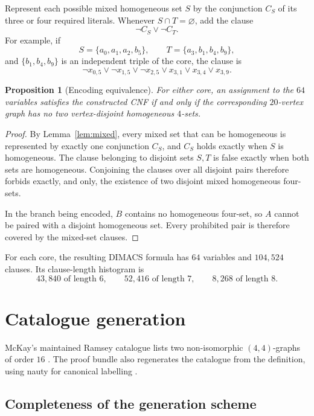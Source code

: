 \documentclass[11pt,a4paper]{article}
\newtheorem{proposition}[theorem]{Proposition}
\theoremstyle{definition}
\theoremstyle{remark}
\begin{document}
Represent each possible mixed homogeneous set \(S\) by the conjunction
\(C_S\) of its three or four required literals.  Whenever
\(S\cap T=\varnothing\), add the clause
\[
  \neg C_S\lor\neg C_T.
\]
For example, if
\[
  S=\{a_0,a_1,a_2,b_5\},
  \qquad
  T=\{a_3,b_1,b_4,b_9\},
\]
and \(\{b_1,b_4,b_9\}\) is an independent triple of the core, the clause
is
\[
 \neg x_{0,5}\vee\neg x_{1,5}\vee\neg x_{2,5}\vee
 x_{3,1}\vee x_{3,4}\vee x_{3,9}.
\]

\begin{proposition}[Encoding equivalence]\label{prop:encoding}
For either core, an assignment to the \(64\) variables satisfies the
constructed CNF if and only if the corresponding \(20\)-vertex graph has
no two vertex-disjoint homogeneous \(4\)-sets.
\end{proposition}

\begin{proof}
By Lemma~\ref{lem:mixed}, every mixed set that can be homogeneous is represented
by exactly one conjunction \(C_S\), and \(C_S\) holds exactly when \(S\)
is homogeneous.  The clause belonging to disjoint sets \(S,T\) is false
exactly when both sets are homogeneous.  Conjoining the clauses over all
disjoint pairs therefore forbids exactly, and only, the existence of two
disjoint mixed homogeneous four-sets.

In the branch being encoded, \(B\) contains no homogeneous four-set, so
\(A\) cannot be paired with a disjoint homogeneous set.  Every prohibited
pair is therefore covered by the mixed-set clauses.
\end{proof}

For each core, the resulting DIMACS formula has \(64\) variables and
\(104{,}524\) clauses.  Its clause-length histogram is
\[
  43{,}840\text{ of length }6,\qquad
  52{,}416\text{ of length }7,\qquad
  8{,}268\text{ of length }8.
\]

\section{Catalogue generation}\label{sec:catalogue}

McKay's maintained Ramsey catalogue lists two non-isomorphic
\((4,4)\)-graphs of order \(16\) \cite{mckay-catalogue}.  The proof bundle
also regenerates the catalogue from the definition, using nauty for
canonical labelling \cite{mckay-piperno}.

\subsection{Completeness of the generation scheme}
\end{document}

